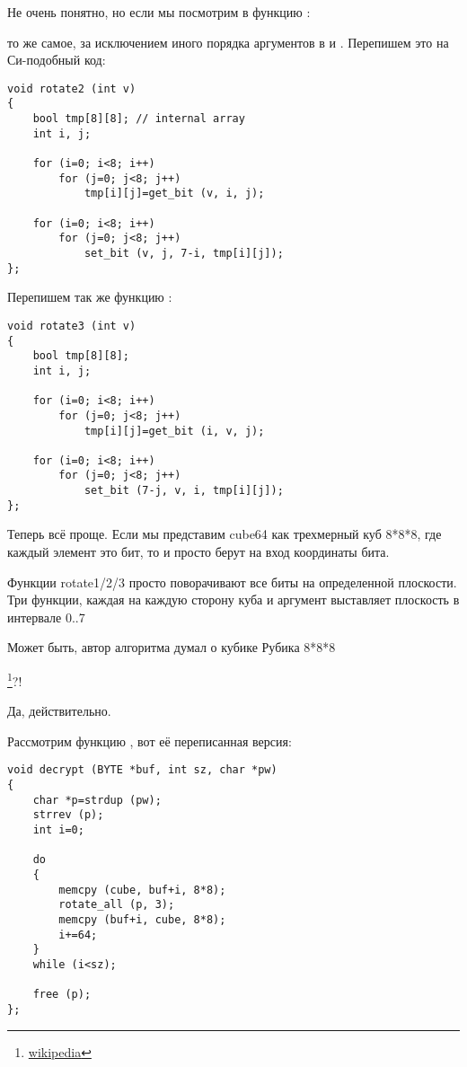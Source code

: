 Не очень понятно, но если мы посмотрим в функцию :



 то же самое, за исключением иного порядка аргументов в  и .
Перепишем это на Си-подобный код:

\begin{lstlisting}[style=customc]
void rotate2 (int v)
{
	bool tmp[8][8]; // internal array
	int i, j;

	for (i=0; i<8; i++)
		for (j=0; j<8; j++)
			tmp[i][j]=get_bit (v, i, j);

	for (i=0; i<8; i++)
		for (j=0; j<8; j++)
			set_bit (v, j, 7-i, tmp[i][j]);
};
\end{lstlisting}

Перепишем так же функцию :

\begin{lstlisting}[style=customasm]
void rotate3 (int v)
{
	bool tmp[8][8];
	int i, j;

	for (i=0; i<8; i++)
		for (j=0; j<8; j++)
			tmp[i][j]=get_bit (i, v, j);

	for (i=0; i<8; i++)
		for (j=0; j<8; j++)
			set_bit (7-j, v, i, tmp[i][j]);
};
\end{lstlisting}

Теперь всё проще. Если мы представим cube64 как трехмерный куб 8*8*8, где каждый элемент это бит,
то  и  просто берут на вход координаты бита.

Функции rotate1/2/3 просто поворачивают все биты на определенной плоскости.
Три функции, каждая на каждую сторону куба и аргумент  выставляет плоскость в интервале 0..7

Может быть, автор алгоритма думал о кубике Рубика 8*8*8

\footnote{\href{http://go.yurichev.com/17115}{wikipedia}}?!

Да, действительно.

Рассмотрим функцию , вот её переписанная версия:%

\begin{lstlisting}[style=customc]
void decrypt (BYTE *buf, int sz, char *pw)
{
	char *p=strdup (pw);
	strrev (p);
	int i=0;

	do
	{
		memcpy (cube, buf+i, 8*8);
		rotate_all (p, 3);
		memcpy (buf+i, cube, 8*8);
		i+=64;
	}
	while (i<sz);
	
	free (p);
};
\end{lstlisting}

